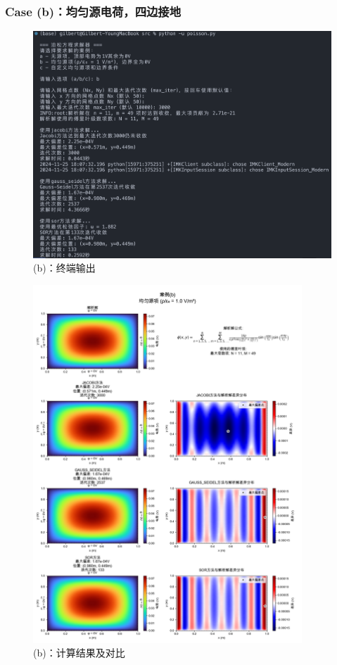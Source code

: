 \subsubsection{Case (b)：均匀源电荷，四边接地}
\begin{figure}[H]
    \centering
    \includegraphics[width=1.0\textwidth]{Problem_1/figs/b_terminal.png}
    \caption{(b)：终端输出}
\end{figure}

\begin{figure}[H]
    \centering
    \includegraphics[width=0.9\textwidth]{Problem_1/figs/b_result.png}
    \caption{(b)：计算结果及对比}
\end{figure}

